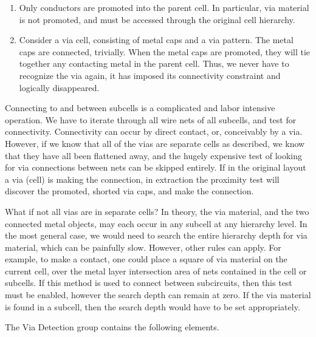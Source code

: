 \begin{enumerate}
\item{Only conductors are promoted into the parent cell.  In
particular, via material is not promoted, and must be accessed through
the original cell hierarchy}.

\item{Consider a via cell, consisting of metal caps and a via pattern. 
The metal caps are connected, trivially.  When the metal caps are
promoted, they will tie together any contacting metal in the parent
cell.  Thus, we never have to recognize the via again, it has imposed
its connectivity constraint and logically disappeared.}
\end{enumerate}

Connecting to and between subcells is a complicated and labor
intensive operation.  We have to iterate through all wire nets of all
subcells, and test for connectivity.  Connectivity can occur by direct
contact, or, conceivably by a via.  However, if we know that all of
the vias are separate cells as described, we know that they have all
been flattened away, and the hugely expensive test of looking for via
connections between nets can be skipped entirely.  If in the original
layout a via (cell) is making the connection, in extraction the
proximity test will discover the promoted, shorted via caps, and make
the connection.

What if not all vias are in separate cells?  In theory, the via
material, and the two connected metal objects, may each occur in any
subcell at any hierarchy level.  In the most general case, we would
need to search the entire hierarchy depth for via material, which can
be painfully slow.  However, other rules can apply.  For example, to
make a contact, one could place a square of via material on the
current cell, over the metal layer intersection area of nets contained
in the cell or subcells.  If this method is used to connect between
subcircuits, then this test must be enabled, however the search depth
can remain at zero.  If the via material is found in a subcell, then
the search depth would have to be set appropriately.

The {\cb Via Detection} group contains the following elements.

